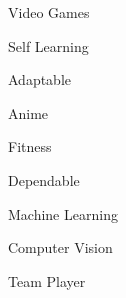 
\begin{cvparagraph}
\vspace{.25cm}
\begin{minipage}{.4\linewidth}
    \begin{cvitems}
        \item{Video Games}
        \item{Self Learning}
        \item{Adaptable}
    \end{cvitems}
\end{minipage}%
\begin{minipage}{.4\linewidth}
  \begin{cvitems}
    \item{Anime}
    \item{Fitness}
    \item{Dependable}
  \end{cvitems}
\end{minipage}%
\begin{minipage}{.4\linewidth}
    \begin{cvitems}
        \item{Machine Learning}
        \item{Computer Vision}
        \item{Team Player}
    \end{cvitems}
\end{minipage}%
\end{cvparagraph}